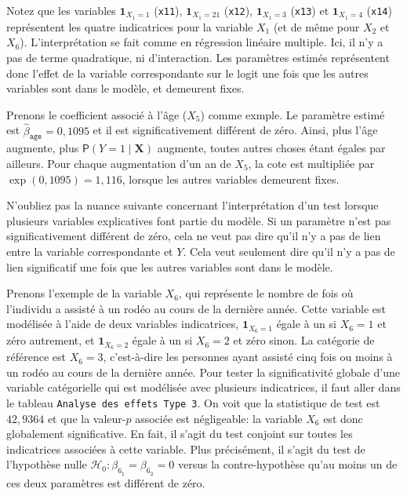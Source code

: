 \documentclass[
  11pt,
  letterpaper,
]{book}
\theoremstyle{definition}
\theoremstyle{definition}
\theoremstyle{definition}
\theoremstyle{remark}
\begin{document}
Notez que les variables \({\mathbf 1}_{X_1=1}\) (\texttt{x11}), \({\mathbf 1}_{X_1=21}\) (\texttt{x12}), \({\mathbf 1}_{X_1=3}\) (\texttt{x13}) et \({\mathbf 1}_{X_1=4}\) (\texttt{x14}) représentent les quatre indicatrices pour la variable \(X_1\) (et de même pour \(X_2\) et \(X_6\)). L'interprétation se fait comme en régression linéaire multiple. Ici, il n'y a pas de terme quadratique, ni d'interaction. Les paramètres estimés représentent donc l'effet de la variable correspondante sur le logit une fois que les autres variables sont dans le modèle, et demeurent fixes.

Prenons le coefficient associé à l'âge (\(X_5\)) comme exmple. Le paramètre estimé est \(\widehat{\beta}_{\texttt{age}}=0,1095\) et il est significativement différent de zéro. Ainsi, plus l'âge augmente, plus \({\mathsf P}\left(Y=1\mid \boldsymbol{X}\right)\) augmente, toutes autres choses étant égales par ailleurs. Pour chaque augmentation d'un an de \(X_5\), la cote est multipliée par \(\exp(0,1095)=1,116\), lorsque les autres variables demeurent fixes.

N'oubliez pas la nuance suivante concernant l'interprétation d'un test lorsque plusieurs variables explicatives font partie du modèle. Si un paramètre n'est pas significativement différent de zéro, cela ne veut pas dire qu'il n'y a pas de lien entre la variable correspondante et \(Y\). Cela veut seulement dire qu'il n'y a pas de lien significatif une fois que les autres variables sont dans le modèle.

Prenons l'exemple de la variable \(X_6\), qui représente le nombre de fois où l'individu a assisté à un rodéo au cours de la dernière année. Cette variable est modélisée à l'aide de deux variables indicatrices, \({\mathbf 1}_{X_6=1}\) égale à un si \(X_6=1\) et zéro autrement, et \({\mathbf 1}_{X_6=2}\) égale à un si \(X_6=2\) et zéro sinon. La catégorie de référence est \(X_6=3\), c'est-à-dire les personnes ayant assisté cinq fois ou moins à un rodéo au cours de la dernière année. Pour tester la significativité globale d'une variable catégorielle qui est modélisée avec plusieurs indicatrices, il faut aller dans le tableau \texttt{Analyse\ des\ effets\ Type\ 3}. On voit que la statistique de test est \(42,9364\) et que la valeur-\(p\) associée est négligeable: la variable \(X_6\) est donc globalement significative. En fait, il s'agit du test conjoint sur toutes les indicatrices associées à cette variable. Plus précisément, il s'agit du test de l'hypothèse nulle \(\mathcal{H}_0: \beta_{6_{\texttt{1}}}=\beta_{6_{\texttt{2}}}=0\) versus la contre-hypothèse qu'au moins un de ces deux paramètres est différent de zéro.
\end{document}
